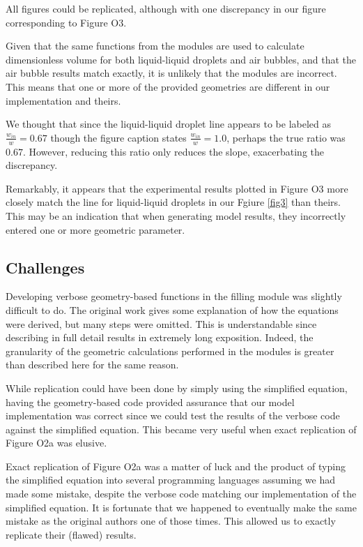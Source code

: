 All figures could be replicated, although with one discrepancy in our figure corresponding to 
Figure O3.

Given that the same functions from the modules are used to calculate dimensionless volume for both
liquid-liquid droplets and air bubbles, and that the air bubble results match exactly, it is
unlikely that the modules are incorrect. This means that one or more of the provided geometries
are different in our implementation and theirs.

We thought that since the liquid-liquid droplet line appears to be labeled
as $\frac{w_{in}}{w}=0.67$ though the figure caption states $\frac{w_{in}}{w}=1.0$,
perhaps the true ratio was $0.67$. However, reducing this ratio only reduces the slope,
exacerbating the discrepancy.

Remarkably, it appears that the experimental results plotted in Figure O3
more closely match the line for liquid-liquid droplets in our Fgiure \ref{fig3}
than theirs. This may be an indication that when generating model results, they incorrectly
entered one or more geometric parameter.

\subsection{Challenges}

Developing verbose geometry-based functions in the filling module was slightly difficult to do.
The original work gives some explanation of how the equations were derived, but many steps were
omitted. This is understandable since describing in full detail results in extremely long
exposition. Indeed, the granularity of the geometric calculations performed in the modules
is greater than described here for the same reason.

While replication could have been done by simply using the simplified equation, having
the geometry-based code provided assurance that our model implementation was correct since
we could test the results of the verbose code against the simplified equation. This became very
useful when exact replication of Figure O2a was elusive.

Exact replication of Figure O2a was a matter of luck and the product of typing the simplified
equation into several programming languages assuming we had made some mistake, despite the
verbose code matching our implementation of the simplified equation. It is fortunate that we
happened to eventually make the same mistake as the original authors one of those times. This
allowed us to exactly replicate their (flawed) results.

